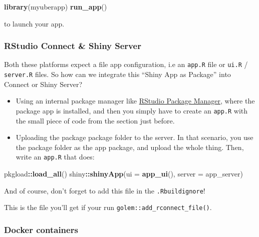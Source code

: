 \documentclass[]{book}
\newenvironment{Shaded}{\begin{snugshade}}{\end{snugshade}}
\newcommand{\DataTypeTok}[1]{\textcolor[rgb]{0.13,0.29,0.53}{#1}}
\newcommand{\KeywordTok}[1]{\textcolor[rgb]{0.13,0.29,0.53}{\textbf{#1}}}
\newcommand{\NormalTok}[1]{#1}
\newcommand{\OperatorTok}[1]{\textcolor[rgb]{0.81,0.36,0.00}{\textbf{#1}}}
\begin{document}
\begin{Shaded}
\begin{Highlighting}[]
\KeywordTok{library}\NormalTok{(myuberapp)}
\KeywordTok{run_app}\NormalTok{()}
\end{Highlighting}
\end{Shaded}

to launch your app.

\hypertarget{rstudio-connect-shiny-server}{%
\subsubsection{RStudio Connect \& Shiny Server}\label{rstudio-connect-shiny-server}}

Both these platforms expect a file app configuration, i.e an \texttt{app.R} file or \texttt{ui.R} / \texttt{server.R} files. So how can we integrate this ``Shiny App as Package'' into Connect or Shiny Server?

\begin{itemize}
\item
  Using an internal package manager like \href{https://www.rstudio.com/products/package-manager/}{RStudio Package Manager}, where the package app is installed, and then you simply have to create an \texttt{app.R} with the small piece of code from the section just before.
\item
  Uploading the package package folder to the server. In that scenario, you use the package folder as the app package, and upload the whole thing. Then, write an \texttt{app.R} that does:
\end{itemize}

\begin{Shaded}
\begin{Highlighting}[]
\NormalTok{pkgload}\OperatorTok{::}\KeywordTok{load_all}\NormalTok{()}
\NormalTok{shiny}\OperatorTok{::}\KeywordTok{shinyApp}\NormalTok{(}\DataTypeTok{ui =} \KeywordTok{app_ui}\NormalTok{(), }\DataTypeTok{server =}\NormalTok{ app_server)}
\end{Highlighting}
\end{Shaded}

And of course, don't forget to add this file in the \texttt{.Rbuildignore}!

This is the file you'll get if your run \texttt{golem::add\_rconnect\_file()}.

\hypertarget{docker-containers}{%
\subsubsection{Docker containers}\label{docker-containers}}
\end{document}

